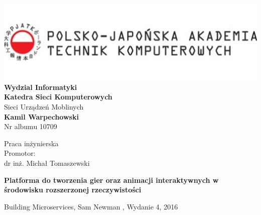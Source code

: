 \documentclass[12pt]{article}
\begin{document}
\thispagestyle{firststyle}
\begin{center}
\includegraphics[width=1\textwidth]{images/logo.jpg}
\textbf{Wydzial Informatyki} \\
\vspace{3em}
\textbf{Katedra Sieci Komputerowych} \\
Sieci Urządzeń Moblinych \\
\vspace{3em}
\textbf{Kamil Warpechowski} \\
Nr albumu 10709
\end{center}


\vspace{3em}
{\addtolength{\leftskip}{70mm}

\noindent
Praca inżynierska
\\Promotor:
\\dr inż. Michał Tomaszewski

}

\vspace{3em}

\begin{center}
\textbf {
Platforma do tworzenia gier oraz animacji interaktywnych w środowisku rozszerzonej rzeczywistości
}
\end{center}

\newpage
\tableofcontents
\newpage
  











\newpage
\thispagestyle{empty}
  
\listoffigures
\listoftables
\lstlistoflistings


\begin{thebibliography}{99}
 Building Microservices,  Sam Newman , Wydanie 4, 2016
\end{thebibliography}
\end{document}
